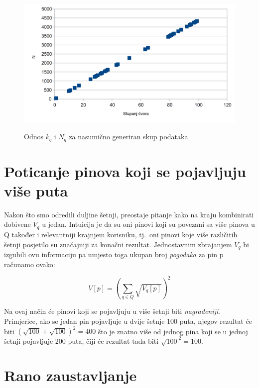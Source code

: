 \documentclass[times, utf8, seminar]{fer}
\begin{document}
\begin{figure}[h]
	\centering
	\includegraphics[width=\textwidth]{degree_chart}
	\caption{Odnos $k_q$ i $N_q$ za nasumično generiran skup podataka}
	\cite{medium-article}
	\label{fig:pins_boards}
\end{figure}

\section{Poticanje pinova koji se pojavljuju više puta}

Nakon što smo odredili duljine šetnji, preostaje pitanje kako na kraju kombinirati dobivene $V_q$ u jedan. Intuicija je da su oni pinovi koji su povezani sa više pinova u Q također i relevantniji krajnjem korisniku, tj.\ oni pinovi koje više različitih šetnji posjetilo su značajniji za konačni rezultat. Jednostavnim zbrajanjem $V_q$ bi izgubili ovu informaciju pa umjesto toga ukupan broj \textit{pogodaka} za pin p računamo ovako:

\begin{centering}
		  $$ V[p] = (\sum_{q \in Q}{\sqrt{V_q[p]}})^2 $$
		  \par
\end{centering}

Na ovaj način će pinovi koji se pojavljuju u više šetnji biti \textit{nagrađeniji}. Primjerice, ako se jedan pin pojavljuje u dvije šetnje 100 puta, njegov rezultat će biti $ (\sqrt{100} + \sqrt{100})^2 = 400 $ što je znatno više od jednog pina koji se u jednoj šetnji pojavljuje 200 puta, čiji će rezultat tada biti $ \sqrt{100}^2 = 100 $.

\section{Rano zaustavljanje}
\end{document}
